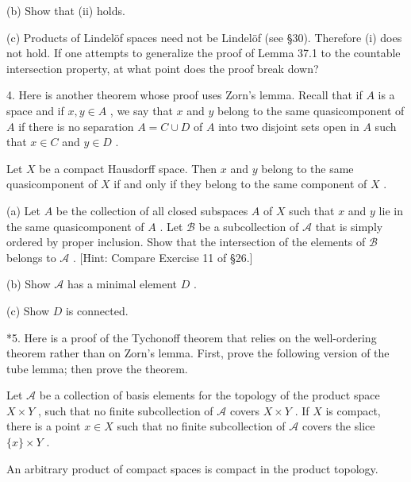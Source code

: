 (b) Show that (ii) holds.

(c) Products of Lindelöf spaces need not be Lindelöf (see §30). Therefore (i) does not hold. If one attempts to generalize the proof of Lemma 37.1 to the countable intersection property, at what point does the proof break down?

4. Here is another theorem whose proof uses Zorn’s lemma. Recall that if \(A\) is a space and if \(x,y \in  A\) , we say that \(x\) and \(y\) belong to the same quasicomponent of \(A\) if there is no separation \(A = C \cup  D\) of \(A\) into two disjoint sets open in \(A\) such that \(x \in  C\) and \(y \in  D\) .

\begin{theorem} Let \(X\) be a compact Hausdorff space. Then \(x\) and \(y\) belong to the same quasicomponent of \(X\) if and only if they belong to the same component of \(X\) .
\end{theorem}

(a) Let \(A\) be the collection of all closed subspaces \(A\) of \(X\) such that \(x\) and \(y\) lie in the same quasicomponent of \(A\) . Let \(\mathcal{B}\) be a subcollection of \(\mathcal{A}\) that is simply ordered by proper inclusion. Show that the intersection of the elements of \(\mathcal{B}\) belongs to \(\mathcal{A}\) . [Hint: Compare Exercise 11 of §26.]

(b) Show \(\mathcal{A}\) has a minimal element \(D\) .

(c) Show \(D\) is connected.

*5. Here is a proof of the Tychonoff theorem that relies on the well-ordering theorem rather than on Zorn's lemma. First, prove the following version of the tube lemma; then prove the theorem.

\begin{lemma} Let \(\mathcal{A}\) be a collection of basis elements for the topology of the product space \(X \times  Y\) , such that no finite subcollection of \(\mathcal{A}\) covers \(X \times  Y\) . If \(X\) is compact, there is a point \(x \in  X\) such that no finite subcollection of \(\mathcal{A}\) covers the slice \(\{ x\}  \times  Y\) .
\end{lemma}

\begin{theorem} An arbitrary product of compact spaces is compact in the product topology.
\end{theorem}

